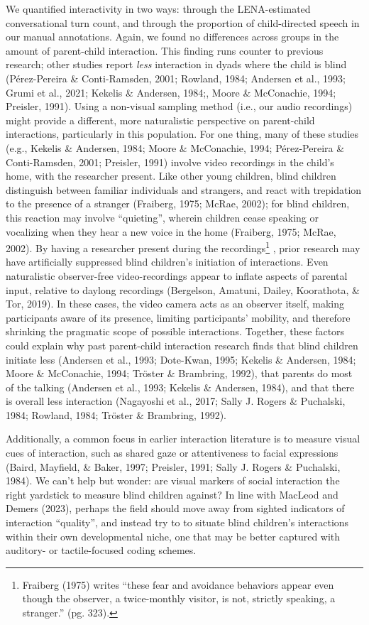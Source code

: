 \documentclass[
  man,floatsintext]{apa6}
\begin{document}
We quantified interactivity in two ways: through the LENA-estimated conversational turn count, and through the proportion of child-directed speech in our manual annotations. Again, we found no differences across groups in the amount of parent-child interaction. This finding runs counter to previous research; other studies report \emph{less} interaction in dyads where the child is blind (Pérez-Pereira \& Conti-Ramsden, 2001; Rowland, 1984; Andersen et al., 1993; Grumi et al., 2021; Kekelis \& Andersen, 1984;, Moore \& McConachie, 1994; Preisler, 1991). Using a non-visual sampling method (i.e., our audio recordings) might provide a different, more naturalistic perspective on parent-child interactions, particularly in this population. For one thing, many of these studies (e.g., Kekelis \& Andersen, 1984; Moore \& McConachie, 1994; Pérez-Pereira \& Conti-Ramsden, 2001; Preisler, 1991) involve video recordings in the child's home, with the researcher present. Like other young children, blind children distinguish between familiar individuals and strangers, and react with trepidation to the presence of a stranger (Fraiberg, 1975; McRae, 2002); for blind children, this reaction may involve ``quieting'', wherein children cease speaking or vocalizing when they hear a new voice in the home (Fraiberg, 1975; McRae, 2002). By having a researcher present during the recordings\footnote{Fraiberg (1975) writes ``these fear and avoidance behaviors appear even though the observer, a twice-monthly visitor, is not, strictly speaking, a stranger.'' (pg. 323).} , prior research may have artificially suppressed blind children's initiation of interactions. Even naturalistic observer-free video-recordings appear to inflate aspects of parental input, relative to daylong recordings (Bergelson, Amatuni, Dailey, Koorathota, \& Tor, 2019). In these cases, the video camera acts as an observer itself, making participants aware of its presence, limiting participants' mobility, and therefore shrinking the pragmatic scope of possible interactions. Together, these factors could explain why past parent-child interaction research finds that blind children initiate less (Andersen et al., 1993; Dote-Kwan, 1995; Kekelis \& Andersen, 1984; Moore \& McConachie, 1994; Tröster \& Brambring, 1992), that parents do most of the talking (Andersen et al., 1993; Kekelis \& Andersen, 1984), and that there is overall less interaction (Nagayoshi et al., 2017; Sally J. Rogers \& Puchalski, 1984; Rowland, 1984; Tröster \& Brambring, 1992).

Additionally, a common focus in earlier interaction literature is to measure visual cues of interaction, such as shared gaze or attentiveness to facial expressions (Baird, Mayfield, \& Baker, 1997; Preisler, 1991; Sally J. Rogers \& Puchalski, 1984). We can't help but wonder: are visual markers of social interaction the right yardstick to measure blind children against? In line with MacLeod and Demers (2023), perhaps the field should move away from sighted indicators of interaction ``quality'', and instead try to to situate blind children's interactions within their own developmental niche, one that may be better captured with auditory- or tactile-focused coding schemes.
\end{document}

